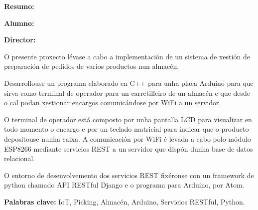 
\thispagestyle{empty}

\bigskip
\bigskip

\large{
\textbf{Resumo:}}

\bigskip
\bigskip


\begin{center}
\textbf{\titulouno}
\end{center}

\bigskip
\bigskip
\large{
\textbf{Alumno:}}\alumno

\large{
\textbf{Director:}} \tutoruno


%


%
%
\bigskip
\bigskip


O presente proxecto lévase a cabo a implementación de un sistema de xestión de preparación de pedidos de varios productos nun almacén.

Desarrollouse un programa elaborado en C++ para unha placa Arduino para que sirva como terminal de operador para un carretilleiro de un almacén e que desde o cal podan xestionar encargos comunicándose por WiFi a un servidor.

O terminal de operador está composto por unha pantalla LCD para visualizar en todo momento o encargo e por un teclado matricial para indicar que o producto depositouse nunha caixa.
A comunicación por WiFi é levada a cabo polo módulo ESP8266 mediante servicios REST a un servidor que dispón dunha base de datos relacional.

O entorno de desenvolvemento dos servicios REST fixéronse con un framework de python chamado API RESTful Django e o programa para Arduino, por Atom.
 

\bigskip
\bigskip

\textbf{Palabras clave:} IoT, Picking, Almacén, Arduino, Servicios RESTful, Python.


\newpage{\pagestyle{empty}\cleardoublepage}